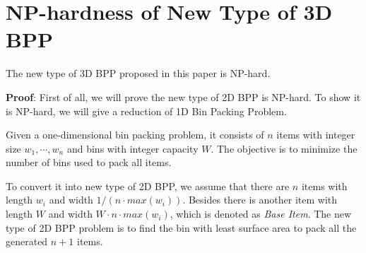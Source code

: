 \documentclass[sigconf]{acmart}
\begin{document}
%
%






\maketitle

\renewcommand{\thefootnote}{\fnsymbol{footnote}}
\renewcommand{\thefootnote}{\arabic{footnote}}

\begin{CJK}{UTF8}{gbsn}
	
	
	
	
	
	
	
	
	
	
	
	
	
	
	
\end{CJK}




\appendix
\section{NP-hardness of New Type of 3D BPP}
\label{np-hard}
\begin{lemma} 
	The new type of 3D BPP proposed in this paper is NP-hard.
\end{lemma}
\textbf{Proof}: 
First of all, we will prove the new type of 2D BPP is NP-hard. To show it is NP-hard, we will give a reduction of 1D Bin Packing Problem. 

Given a one-dimensional bin packing problem, it consists of $n$ items with integer size $w_1,\cdots,w_n$ and bins with integer capacity $W$. The objective is to minimize the number of bins used to pack all items.

To convert it into new type of 2D BPP, we assume that there are $n$ items with length $w_i$ and width $1/(n \cdot max({w_i}))$. Besides there is another item with length $W$ and width $W \cdot n  \cdot max(w_i)$, which is denoted as \emph{Base Item}. The new type of 2D BPP problem is to find the bin with least surface area to pack all the generated $n+1$ items.
\end{document}
